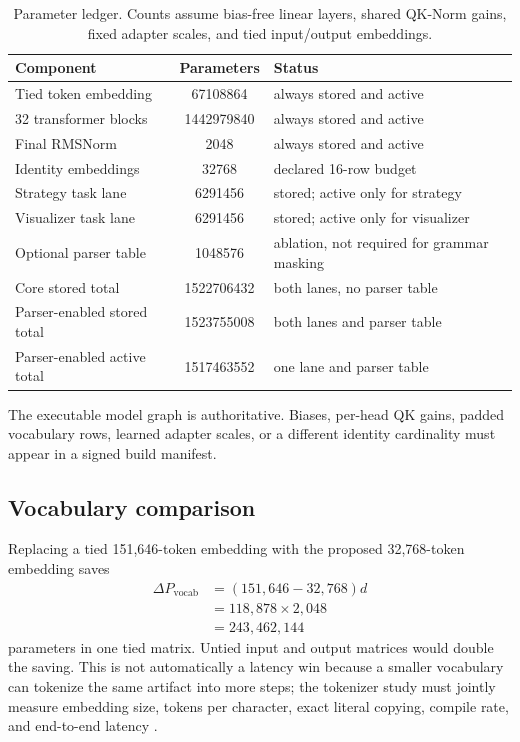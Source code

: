 \documentclass[10pt,letterpaper]{article}
\newcommand{\1}{\mathbb{1}}
\begin{document}
\begin{table}[t]
\centering
\caption{Parameter ledger.  Counts assume bias-free linear layers, shared QK-Norm gains, fixed
adapter scales, and tied input/output embeddings.}
\label{tab:parameter-ledger}
\small
\begin{tabularx}{\linewidth}{@{}Y S[table-format=10.0] Y@{}}
\toprule
Component & {Parameters} & Status \\
\midrule
Tied token embedding & 67108864 & always stored and active \\
32 transformer blocks & 1442979840 & always stored and active \\
Final RMSNorm & 2048 & always stored and active \\
Identity embeddings & 32768 & declared 16-row budget \\
Strategy task lane & 6291456 & stored; active only for strategy \\
Visualizer task lane & 6291456 & stored; active only for visualizer \\
Optional parser table & 1048576 & ablation, not required for grammar masking \\
\midrule
Core stored total & 1522706432 & both lanes, no parser table \\
Parser-enabled stored total & 1523755008 & both lanes and parser table \\
Parser-enabled active total & 1517463552 & one lane and parser table \\
\bottomrule
\end{tabularx}
\end{table}

The executable model graph is authoritative.  Biases, per-head QK gains, padded vocabulary rows,
learned adapter scales, or a different identity cardinality must appear in a signed build manifest.

\subsection{Vocabulary comparison}

Replacing a tied 151,646-token embedding with the proposed 32,768-token embedding saves
\begin{align}
  \Delta P_{\mathrm{vocab}}
  &=(151{,}646-32{,}768)d\\
  &=118{,}878\times2{,}048\\
  &=243{,}462{,}144
  \label{eq:vocab-saving}
\end{align}
parameters in one tied matrix.  Untied input and output matrices would double the saving.  This is
not automatically a latency win because a smaller vocabulary can tokenize the same artifact into
more steps; the tokenizer study must jointly measure embedding size, tokens per character, exact
literal copying, compile rate, and end-to-end latency \cite{hui2024qwen25,guo2024deepseekcoder}.
\end{document}
